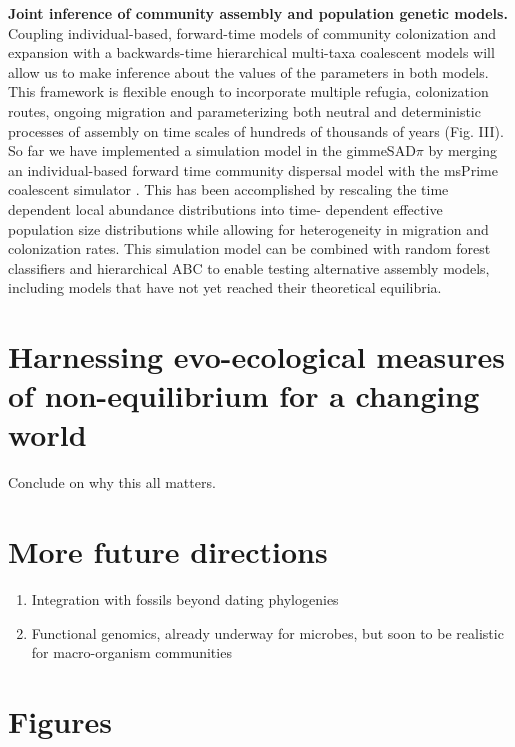 \documentclass[12pt]{article}
\begin{document}
{\begin{minipage}{0.97\textwidth}
    {\bf Joint inference of community assembly and population genetic
      models.} Coupling individual-based, forward-time models of
    community colonization and expansion with a backwards-time
    hierarchical multi-taxa coalescent models will allow us to make
    inference about the values of the parameters in both models. This
    framework is flexible enough to incorporate multiple refugia,
    colonization routes, ongoing migration and parameterizing both
    neutral and deterministic processes of assembly on time scales of
    hundreds of thousands of years (Fig. III). So far we have
    implemented a simulation model in the gimmeSAD$\pi$
    \citep{overcast} by merging an individual-based forward time
    community dispersal model \citep{rosindel} with the msPrime
    coalescent simulator \citep{msPrime}. This has been accomplished
    by rescaling the time dependent local abundance distributions into
    time- dependent effective population size distributions while
    allowing for heterogeneity in migration and colonization
    rates. This simulation model can be combined with random forest
    classifiers and hierarchical ABC to enable testing alternative
    assembly models, including models that have not yet reached their
    theoretical equilibria.
  \end{minipage}
}


\section{Harnessing evo-ecological measures of non-equilibrium for a changing world}

Conclude on why this all matters.

\section{More future directions}

\begin{enumerate}
\item Integration with fossils beyond dating phylogenies
\item Functional genomics, already underway for microbes, but soon to
  be realistic for macro-organism communities
\end{enumerate}

\pagebreak

\section*{Figures}
\end{document}
